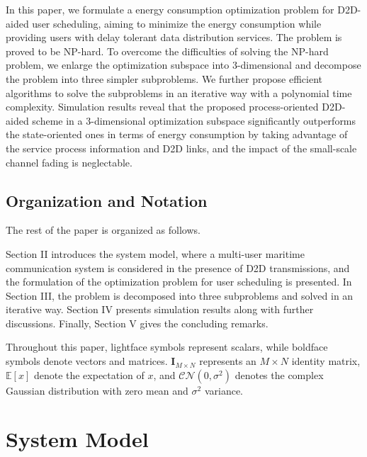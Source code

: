 \documentclass{ieeeaccess}
\begin{document}

In this paper, we formulate a energy consumption optimization problem for D2D-aided user scheduling, aiming to minimize the energy consumption while providing users with delay tolerant data distribution services. The problem is proved to be NP-hard. To overcome the difficulties of solving the NP-hard problem, we enlarge the optimization subspace into 3-dimensional and decompose the problem into three simpler subproblems. We further propose efficient algorithms to solve the subproblems in an iterative way with a polynomial time complexity.
Simulation results reveal that the proposed process-oriented D2D-aided scheme in a 3-dimensional optimization subspace significantly outperforms the state-oriented ones in terms of energy consumption by taking advantage of the service process information and D2D links, and the impact of the small-scale channel fading is neglectable. 


\subsection{Organization and Notation}
The rest of the paper is organized as follows.

Section II introduces the system model, where a multi-user maritime communication system is considered in the presence of D2D transmissions, and the formulation of the optimization problem for user scheduling is presented.
In Section III,  the problem is decomposed into three subproblems and solved in an iterative way.
Section IV presents simulation results along with further discussions.
Finally, Section V gives the concluding remarks.

Throughout this paper, lightface symbols represent scalars, while boldface symbols denote vectors and matrices. ${\mathbf{I}}_{M \times N}$ represents an ${M \times N}$ identity matrix, $\mathbb{E}[x]$ denote the expectation of $x$, and $\mathcal{CN}(0, {\sigma}^2)$ denotes the complex Gaussian distribution with zero mean and ${\sigma}^2$ variance. 



\section{System Model}
\end{document}
